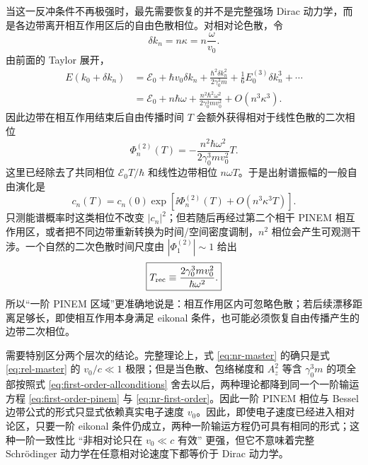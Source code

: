 当这一反冲条件不再极强时，最先需要恢复的并不是完整强场 Dirac 动力学，而是各边带离开相互作用区后的自由色散相位。对相对论色散，令
\begin{equation}
 \delta k_n=n\kappa=n\frac{\omega}{v_0}.
\end{equation}
由前面的 Taylor 展开，
\begin{align}
E(k_0+\delta k_n)
&=\mathcal E_0
+\hbar v_0\delta k_n
+\frac{\hbar^2\delta k_n^2}{2\gamma_0^3m}
+\frac{1}{6}E_0^{(3)}\delta k_n^3+\cdots\\
&=\mathcal E_0+n\hbar\omega
+\frac{n^2\hbar^2\omega^2}{2\gamma_0^3mv_0^2}
+O(n^3\kappa^3).
 \label{eq:sideband-recoil-dispersion}
\end{align}
因此边带在相互作用结束后自由传播时间 $T$ 会额外获得相对于线性色散的二次相位
\begin{equation}
 \boxed{
 \Phi_n^{(2)}(T)
 =-\frac{n^2\hbar\omega^2}{2\gamma_0^3mv_0^2}T.}
 \label{eq:quadratic-recoil-phase}
\end{equation}
这里已经除去了共同相位 $\mathcal E_0T/\hbar$ 和线性边带相位 $n\omega T$。于是出射谱振幅的一般自由演化是
\begin{equation}
 c_n(T)=c_n(0)
 \exp\!\left[\ii\Phi_n^{(2)}(T)+O(n^3\kappa^3T)\right].
 \label{eq:sideband-free-propagation}
\end{equation}
只测能谱概率时这类相位不改变 $|c_n|^2$；但若随后再经过第二个相干 PINEM 相互作用区，或者把不同边带重新转换为时间/空间密度调制，$n^2$ 相位会产生可观测干涉。一个自然的二次色散时间尺度由 $|\Phi_1^{(2)}|\sim1$ 给出
\begin{equation}
 \boxed{
 T_{\rm rec}
 \equiv\frac{2\gamma_0^3mv_0^2}{\hbar\omega^2}.}
 \label{eq:recoil-time-scale}
\end{equation}
所以“一阶 PINEM 区域”更准确地说是：相互作用区内可忽略色散；若后续漂移距离足够长，即使相互作用本身满足 eikonal 条件，也可能必须恢复自由传播产生的边带二次相位。

需要特别区分两个层次的结论。完整理论上，式 \eqref{eq:nr-master} 的确只是式 \eqref{eq:rel-master} 的 $v_0/c\ll1$ 极限；但是当色散、包络梯度和 $A_z^2$ 等含 $\gamma_0^3m$ 的项全部按照式 \eqref{eq:first-order-allconditions} 舍去以后，两种理论都降到同一个一阶输运方程 \eqref{eq:first-order-pinem} 与 \eqref{eq:nr-first-order}。因此一阶 PINEM 相位与 Bessel 边带公式的形式只显式依赖真实电子速度 $v_0$。因此，即使电子速度已经进入相对论区，只要一阶 eikonal 条件仍成立，两种一阶输运方程仍可具有相同的形式；这种一阶一致性比 ``非相对论只在 $v_0\ll c$ 有效'' 更强，但它不意味着完整 Schr\"odinger 动力学在任意相对论速度下都等价于 Dirac 动力学。






